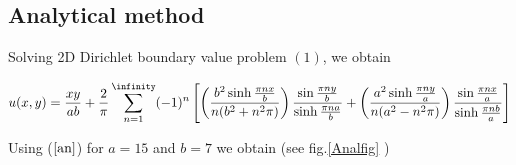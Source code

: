 \subsection*{Analytical method}

Solving 2D Dirichlet  boundary value problem $(1)$, we obtain

\begin{equation}\label{an}
    u(x,y) = \frac{xy}{ab} + \frac{2}{\pi} \sum_{n=1}^{\infinity}(-1)^n\left[\left(\frac{b^2 \sinh{\frac{\pi n x }{b}}}{n(b^2 + n^2\pi)}\right)\frac{\sin{\frac{\pi n y}{b}}}{\sinh{\frac{\pi n a }{b}}} +  \left(\frac{a^2 \sinh{\frac{\pi n y }{a}}}{n(a^2 - n^2\pi)}\right)\frac{\sin{\frac{\pi n x}{a}}}{\sinh{\frac{\pi n b }{a}}}\right]
\end{equation}

Using ($\ref{an}$)  for $a=15$ and $b=7$ we obtain (see fig.\ref{Analfig} )

